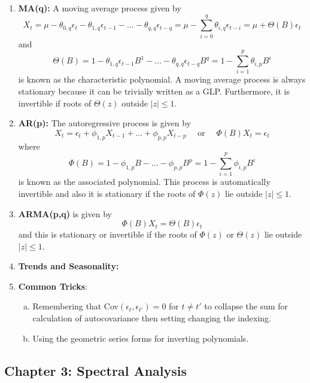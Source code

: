 \documentclass{article}
\begin{document}
\begin{enumerate}
    \item \textbf{MA(q):} A moving average process given by
    \[
    X_t = \mu - \theta_{0,q}\epsilon_t - \theta_{1,q}\epsilon_{t-1} - \dots - \theta_{q,q}\epsilon_{t-q} = \mu - \sum_{i=0}^{q} \theta_{i,q} \epsilon_{t-i} = \mu +\Theta(B)\epsilon_t
    \]
     and 
    \[
    \Theta(B) 
    = 1-\theta_{1,q}\epsilon_{t-1}B^1 - \dots - \theta_{q,q}\epsilon_{t-q}B^q 
    = 1 - \sum_{i=1}^{p}\theta_{i,p}B^i
    \]
    is known as the characteristic polynomial. A moving average process is always stationary because it can be trivially written as a GLP. Furthermore, it is invertible if roots of \(\Theta(z)\) outside \(|z|\leq 1\).
    \item \textbf{AR(p):} The autoregressive process is given by
    \[
    X_t = \epsilon_t +\phi_{1,p}X_{t-1} + \dots + \phi_{p,p}X_{t-p} 
    \quad \text{ or } \quad 
    \Phi(B)X_t = \epsilon_t
    \]
    where
    \[
    \Phi(B) 
    = 1 - \phi_{1,p}B - \dots - \phi_{p,p}B^p
    = 1 - \sum_{i=1}^{p}\phi_{i,p}B^i
    \]
    is known as the associated polynomial. This process is automatically invertible and also it is stationary if the roots of \(\Phi(z)\) lie outside \(|z|\leq 1\).
    \item \textbf{ARMA(p,q)} is given by
    \[
    \Phi(B)X_t = \Theta(B)\epsilon_t
    \]
    and this is stationary or invertible if the roots of \(\Phi(z)\) or \(\Theta(z)\) lie outside \(|z|\leq 1\).

    \item \textbf{Trends and Seasonality:}

    \item \textbf{Common Tricks}:
    \begin{enumerate} [a.]
        \item Remembering that Cov\((\epsilon_t, \epsilon_{t'}) =0\) for \(t \neq t'\) to collapse the sum for calculation of autocovariance then setting changing the indexing.
        \item Using the geometric series forms for inverting polynomials. 
    \end{enumerate}
\end{enumerate}

\subsection*{Chapter 3: Spectral Analysis}
\end{document}
